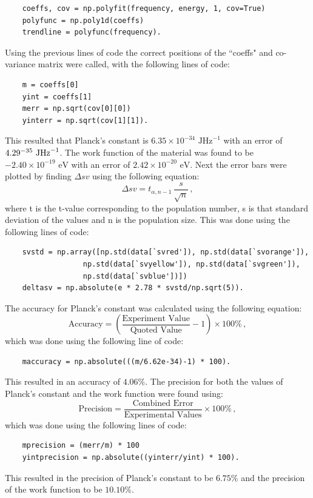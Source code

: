 \documentclass[12pt, a4paper]{article}
\begin{document}
\begin{lstlisting}
    coeffs, cov = np.polyfit(frequency, energy, 1, cov=True)
    polyfunc = np.poly1d(coeffs)
    trendline = polyfunc(frequency).
\end{lstlisting}
Using the previous lines of code the correct positions of the ``coeffs" and co-variance matrix were called, with the following lines of code:
\begin{lstlisting}
    m = coeffs[0]
    yint = coeffs[1]
    merr = np.sqrt(cov[0][0])
    yinterr = np.sqrt(cov[1][1]).
\end{lstlisting}
This resulted that Planck's constant is $6.35\times10^{-34} \text{ JHz}^{-1}$ with an error of $4.29\time10^{-35} \text{ JHz}^{-1}$. The work function of the material was found to be $-2.40\times10^{-19} \text{ eV}$ with an error of $2.42\times10^{-20} \text{ eV}$. Next the error bars were plotted by finding $\Delta sv$ using the following equation:
\begin{equation}
    \Delta sv = t_{\alpha, n-1}\, \frac{s}{\sqrt{n}}\,,
\end{equation}
where t is the t-value corresponding to the population number, s is that standard deviation of the values and n is the population size. This was done using the following lines of code:
\begin{lstlisting}
    svstd = np.array([np.std(data[`svred']), np.std(data[`svorange']), 
                  np.std(data[`svyellow']), np.std(data[`svgreen']), 
                  np.std(data[`svblue'])])
    deltasv = np.absolute(e * 2.78 * svstd/np.sqrt(5)).
\end{lstlisting}
The accuracy for Planck's constant was calculated using the following equation:
\begin{equation}
    \text{Accuracy} = \left(\frac{\text{Experiment Value}}{\text{Quoted Value}}-1\right) \times 100\%\,,
\end{equation}
which was done using the following line of code:
\begin{lstlisting}
    maccuracy = np.absolute(((m/6.62e-34)-1) * 100).
\end{lstlisting}
This resulted in an accuracy of $4.06\%$. The precision for both the values of Planck's constant and the work function were found using:
\begin{equation}
    \text{Precision} = \frac{\text{Combined Error}}{\text{Experimental Values}} \times 100 \% \,,
\end{equation}
which was done using the following lines of code:
\begin{lstlisting}
    mprecision = (merr/m) * 100
    yintprecision = np.absolute((yinterr/yint) * 100).
\end{lstlisting}
This resulted in the precision of Planck's constant to be $6.75\%$ and the precision of the work function to be $10.10\%$.
\end{document}
